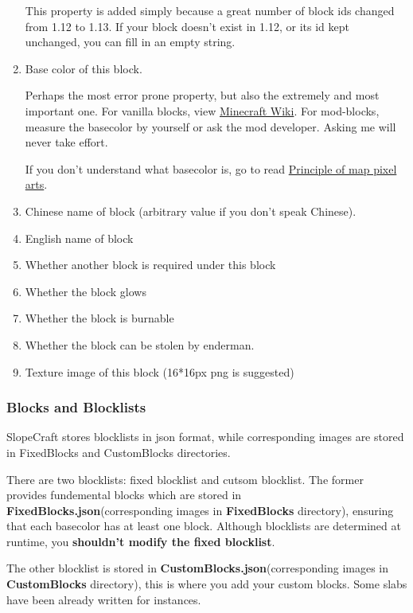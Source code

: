 \documentclass{article}
\begin{document}
\begin{enumerate}
          This property is added simply because a great number of block ids changed from 1.12 to 1.13. If your block doesn't exist in 1.12, or its id kept unchanged, you can fill in an empty string.

    \item Base color of this block.

          Perhaps the most error prone property, but also the extremely and most important one. For vanilla blocks, view \href{https://minecraft.fandom.com/wiki/Map_item_format}{Minecraft Wiki}. For mod-blocks, measure the basecolor by yourself or ask the mod developer. Asking me will never take effort.

          If you don't understand what basecolor is, go to read \href{https://github.com/ToKiNoBug/SlopeCraftTutorial/blob/main/BasicPrinciple/Principle%20of%20map%20pixel%20arts.md}{Principle of map pixel arts}.

    \item Chinese name of block (arbitrary value if you don't speak Chinese).
    \item English name of block
    \item Whether another block is required under this block
    \item Whether the block glows
    \item Whether the block is burnable
    \item Whether the block can be stolen by enderman.
    \item Texture image of this block (16*16px png is suggested)
\end{enumerate}

\subsubsection{Blocks and Blocklists}
SlopeCraft stores blocklists in json format, while corresponding images are stored in FixedBlocks and CustomBlocks directories.

There are two blocklists: fixed blocklist and cutsom blocklist. The former provides fundemental blocks which are stored in \textbf{FixedBlocks.json}(corresponding images in \textbf{FixedBlocks} directory), ensuring that each basecolor has at least one block. Although blocklists are determined at runtime, you \textbf{shouldn't modify the fixed blocklist}.

The other blocklist is stored in \textbf{CustomBlocks.json}(corresponding images in \textbf{CustomBlocks} directory), this is where you add your custom blocks. Some slabs have been already written for instances.
\end{document}
